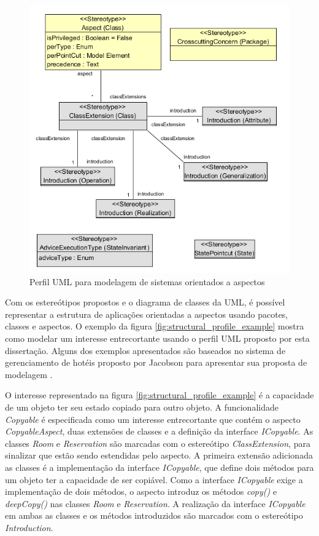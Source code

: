 \begin{figure} \centering
	\includegraphics{img/full_profile.png}
	\caption{Perfil UML para modelagem de sistemas orientados a aspectos}\label{fig:uml_profile}
\end{figure}

Com os estereótipos propostos e o diagrama de classes da UML, é possível representar a estrutura de aplicações orientadas a aspectos usando
pacotes, classes e aspectos. O exemplo da figura \ref{fig:structural_profile_example} mostra como modelar um interesse entrecortante usando o perfil
UML proposto por esta dissertação. Alguns dos exemplos apresentados são baseados no sistema de gerenciamento de hotéis proposto por Jacobson para
apresentar sua proposta de modelagem \cite{Jacobson:2004:ASD:1062430}. 

O interesse representado na figura \ref{fig:structural_profile_example} é a capacidade de um objeto ter seu estado copiado para outro objeto.
A funcionalidade \textit{Copyable} é especificada como um interesse entrecortante que contém o aspecto \textit{CopyableAspect}, duas extensões de classes e a definição da interface \textit{ICopyable}.
As classes \textit{Room} e \textit{Reservation} são marcadas com o estereótipo \textit{ClassExtension}, para sinalizar que estão sendo estendidas pelo aspecto. A primeira extensão adicionada as
classes é a implementação da interface \textit{ICopyable}, que define dois métodos para um objeto ter a capacidade de ser copiável. Como a interface
\textit{ICopyable} exige a implementação de dois métodos, o aspecto introduz os métodos \textit{copy()} e \textit{deepCopy()} nas classes \textit{Room} e \textit{Reservation}. 
A realização da interface \textit{ICopyable} em ambas as classes e os métodos introduzidos são marcados com o estereótipo \textit{Introduction}.

